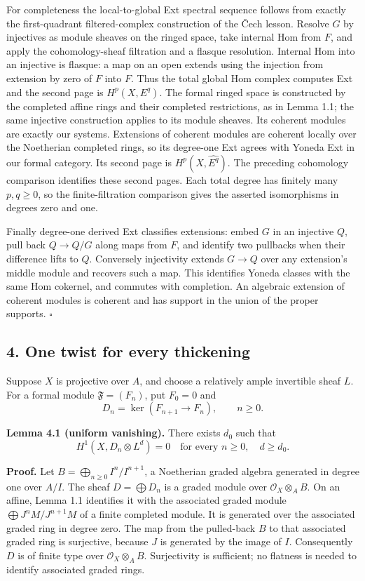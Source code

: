 \documentclass[11pt]{article}
\begin{document}
For completeness the local-to-global Ext spectral sequence follows from
exactly the first-quadrant filtered-complex construction of the Čech
lesson. Resolve \(G\) by injectives as module sheaves on the ringed
space, take internal Hom from \(F\), and apply the cohomology-sheaf
filtration and a flasque resolution. Internal Hom into an injective is
flasque: a map on an open extends using the injection from extension by
zero of \(F\) into \(F\). Thus the total global Hom complex computes Ext
and the second page is \(H^p(X,E^q)\). The formal ringed space is
constructed by the completed affine rings and their completed
restrictions, as in Lemma 1.1; the same injective construction applies
to its module sheaves. Its coherent modules are exactly our systems.
Extensions of coherent modules are coherent locally over the Noetherian
completed rings, so its degree-one Ext agrees with Yoneda Ext in our
formal category. Its second page is \(H^p(X,\widehat{E^q})\). The
preceding cohomology comparison identifies these second pages. Each
total degree has finitely many \(p,q\ge0\), so the finite-filtration
comparison gives the asserted isomorphisms in degrees zero and one.

Finally degree-one derived Ext classifies extensions: embed \(G\) in an
injective \(Q\), pull back \(Q\to Q/G\) along maps from \(F\), and
identify two pullbacks when their difference lifts to \(Q\). Conversely
injectivity extends \(G\to Q\) over any extension's middle module and
recovers such a map. This identifies Yoneda classes with the same Hom
cokernel, and commutes with completion. An algebraic extension of
coherent modules is coherent and has support in the union of the proper
supports. \(\square\)

\subsection{4. One twist for every
thickening}\label{one-twist-for-every-thickening}

Suppose \(X\) is projective over \(A\), and choose a relatively ample
invertible sheaf \(L\). For a formal module \(\mathfrak F=(F_n)\), put
\(F_0=0\) and \[
D_n=\ker(F_{n+1}\to F_n),\qquad n\geq0.
\]

\textbf{Lemma 4.1 (uniform vanishing).} There exists \(d_0\) such that
\[
H^1(X,D_n\otimes L^d)=0\quad\text{for every }n\geq0,
\quad d\geq d_0.
\]

\textbf{Proof.} Let \(B=\bigoplus_{n\geq0}I^n/I^{n+1}\), a Noetherian
graded algebra generated in degree one over \(A/I\). The sheaf
\(D=\bigoplus D_n\) is a graded module over \(\mathcal O_X\otimes_A B\).
On an affine, Lemma 1.1 identifies it with the associated graded module
\(\bigoplus J^nM/J^{n+1}M\) of a finite completed module. It is
generated over the associated graded ring in degree zero. The map from
the pulled-back \(B\) to that associated graded ring is surjective,
because \(J\) is generated by the image of \(I\). Consequently \(D\) is
of finite type over \(\mathcal O_X\otimes_A B\). Surjectivity is
sufficient; no flatness is needed to identify associated graded rings.
\end{document}
